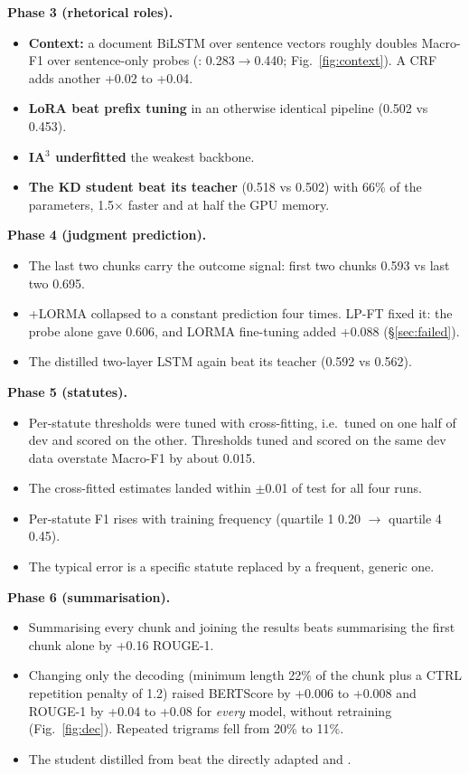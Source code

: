 \textbf{Phase 3 (rhetorical roles).}
\begin{itemize}
\item \textbf{Context:} a document BiLSTM over sentence vectors roughly doubles Macro-F1 over sentence-only probes (\A: 0.283$\rightarrow$0.440; Fig.~\ref{fig:context}). A CRF adds another +0.02 to +0.04.
\item \textbf{LoRA beat prefix tuning} in an otherwise identical pipeline (0.502 vs 0.453).
\item \textbf{IA$^3$ underfitted} the weakest backbone.
\item \textbf{The KD student beat its teacher} (0.518 vs 0.502) with 66\% of the parameters, 1.5$\times$ faster and at half the GPU memory.
\end{itemize}

\textbf{Phase 4 (judgment prediction).}
\begin{itemize}
\item The last two chunks carry the outcome signal: first two chunks 0.593 vs last two 0.695.
\item \A{}+LORMA collapsed to a constant prediction four times. LP-FT fixed it: the probe alone gave 0.606, and LORMA fine-tuning added +0.088 (\S\ref{sec:failed}).
\item The distilled two-layer LSTM again beat its teacher (0.592 vs 0.562).
\end{itemize}

\textbf{Phase 5 (statutes).}
\begin{itemize}
\item Per-statute thresholds were tuned with cross-fitting, i.e.\ tuned on one half of dev and scored on the other. Thresholds tuned and scored on the same dev data overstate Macro-F1 by about 0.015.
\item The cross-fitted estimates landed within $\pm$0.01 of test for all four runs.
\item Per-statute F1 rises with training frequency (quartile 1 0.20 $\rightarrow$ quartile 4 0.45).
\item The typical error is a specific statute replaced by a frequent, generic one.
\end{itemize}

\textbf{Phase 6 (summarisation).}
\begin{itemize}
\item Summarising every chunk and joining the results beats summarising the first chunk alone by +0.16 ROUGE-1.
\item Changing only the decoding (minimum length 22\% of the chunk plus a CTRL repetition penalty \cite{ctrl} of 1.2) raised BERTScore by +0.006 to +0.008 and ROUGE-1 by +0.04 to +0.08 for \emph{every} model, without retraining (Fig.~\ref{fig:dec}). Repeated trigrams fell from 20\% to 11\%.
\item The \C{} student distilled from \A{} beat the directly adapted \B{} and \D{}.
\end{itemize}

